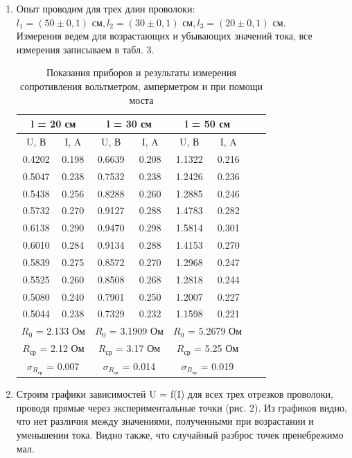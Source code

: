\documentclass[a4paper, 10pt]{article}%
\begin{document}
\begin{enumerate}
\item Опыт проводим для трех длин проволоки: 
$ l_1 = (50\pm 0,1) \text{ см}, l_2 = (30\pm0,1) \text{ см}, l_3 = (20\pm 0,1) \text{ см.}$ \\
Измерения ведем для возрастающих и убывающих значений тока, все измерения записываем в табл. 3.
\begin{table}[h]
\caption{Показания приборов и результаты измерения сопротивления вольтметром, амперметром и при помощи моста}
\centering
\begin{tabular}{||c|c||c|c||c|c||c|c||}
\hline
\multicolumn{2}{||c||}{l = 20 см} & \multicolumn{2}{|c||}{l = 30 см} & \multicolumn{2}{|c||}{l = 50 см} \\
\hline
U, В & I, A & U, В & I, A & U, В & I, A \\
\hline
0.4202 & 0.198 & 0.6639 & 0.208 & 1.1322 & 0.216 \\
0.5047 & 0.238 & 0.7532 & 0.238 & 1.2426 & 0.236 \\
0.5438 & 0.256 & 0.8288 & 0.260 & 1.2885 & 0.246 \\
0.5732 & 0.270 & 0.9127 & 0.288 & 1.4783 & 0.282 \\
0.6138 & 0.290 & 0.9470 & 0.298 & 1.5814 & 0.301 \\
\hline
0.6010 & 0.284 & 0.9134 & 0.288 & 1.4153 & 0.270 \\
0.5839 & 0.275 & 0.8572 & 0.270 & 1.2968 & 0.247 \\
0.5525 & 0.260 & 0.8508 & 0.268 & 1.2818 & 0.244 \\
0.5080 & 0.240 & 0.7901 & 0.250 & 1.2007 & 0.227 \\
0.5044 & 0.238 & 0.7329 & 0.232 & 1.1598 & 0.221 \\
\hline
\multicolumn{2}{||c||}{$R_0$ = 2.133 Ом} & \multicolumn{2}{|c||}{$R_0$ = 3.1909 Ом} & \multicolumn{2}{|c||}{$R_0$ = 5.2679 Ом} \\
\multicolumn{2}{||c||}{$R_\text{ср}$ = 2.12 Ом} & \multicolumn{2}{|c||}{$R_\text{ср}$ = 3.17 Ом} & \multicolumn{2}{|c||}{$R_\text{ср}$ = 5.25 Ом} \\
\multicolumn{2}{||c||}{$\sigma_{R_\text{ср}}$ = 0.007} & \multicolumn{2}{|c||}{$\sigma_{R_\text{ср}}$ = 0.014} & \multicolumn{2}{|c||}{$\sigma_{R_\text{ср}}$ = 0.019} \\
\hline
\end{tabular}
\end{table}
\item Строим графики зависимостей U = f(I) для всех трех отрезков проволоки,  проводя прямые через экспериментальные точки (рис. 2). Из графиков видно, что нет различия между значениями, полученными при возрастании и уменьшении тока. Видно также, что случайный разброс точек пренебрежимо мал.

\end{enumerate}
\end{document}

